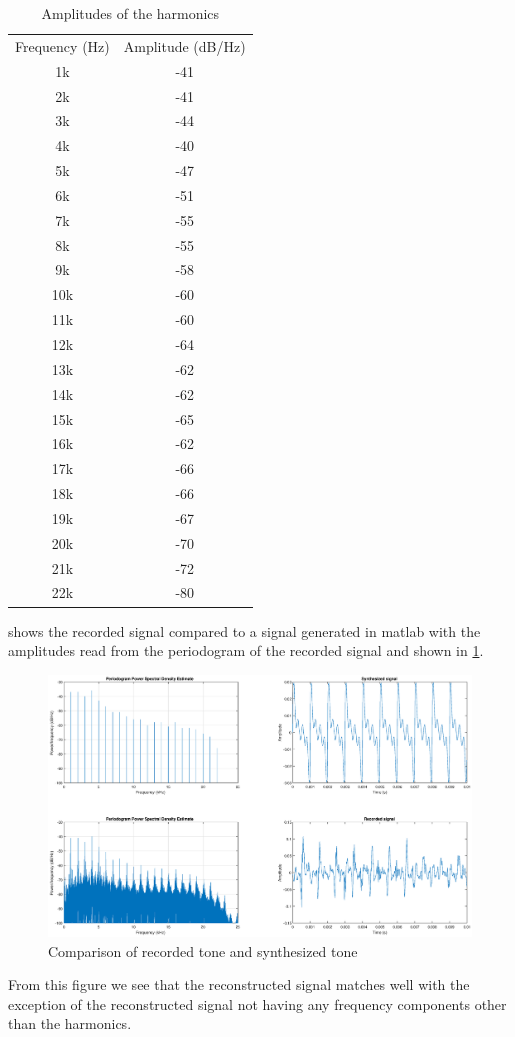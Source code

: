 \begin{table}[]
    \centering
    \begin{tabular}{c|c}
        Frequency (Hz) & Amplitude (dB/Hz) \\
        1k  & -41 \\
        2k  & -41 \\
        3k  & -44 \\
        4k  & -40 \\
        5k  & -47 \\
        6k  & -51 \\
        7k  & -55 \\
        8k  & -55 \\
        9k  & -58 \\
        10k & -60 \\
        11k & -60 \\
        12k & -64 \\
        13k & -62 \\
        14k & -62 \\
        15k & -65 \\
        16k & -62 \\
        17k & -66 \\
        18k & -66 \\
        19k & -67 \\
        20k & -70 \\
        21k & -72 \\
        22k & -80
    \end{tabular}
    \caption{Amplitudes of the harmonics}
    \label{tab:1k_amps}
\end{table}

 shows the recorded signal compared to a signal generated in matlab with the amplitudes read from the periodogram of the recorded signal and shown in \cref{tab:1k_amps}.

\begin{figure}[H]
    \centering
    \includegraphics[trim={4cm 1.6cm 4cm 1.6cm},clip,width=\textwidth]{img/tones.eps}
    \caption{Comparison of recorded tone and synthesized tone}
    \label{fig:tones}
\end{figure}

From this figure we see that the reconstructed signal matches well with the exception of the reconstructed signal not having any frequency components other than the harmonics.